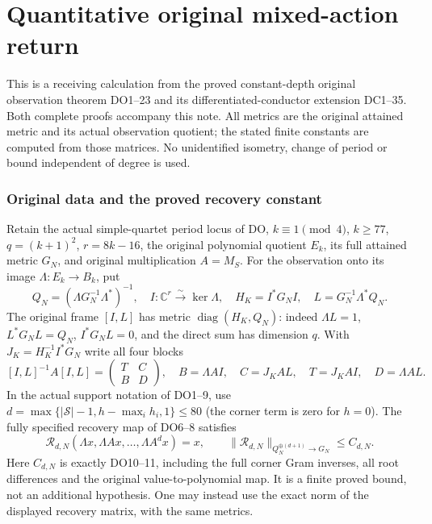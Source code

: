\endgroup

\clearpage\begingroup
\part*{Quantitative original mixed-action return}
\newcommand{\pmixedrank}{\operatorname{rank}}
\newcommand{\pmixeddiag}{\operatorname{diag}}


This is a receiving calculation from the proved constant-depth original
observation theorem DO1--23 and its differentiated-conductor extension
DC1--35. Both complete proofs accompany this note. All metrics are the
original attained metric and its actual observation quotient; the stated
finite constants are computed from those matrices. No unidentified
isometry, change of period or bound independent of degree is used.

\section{Original data and the proved recovery constant}
Retain the actual simple-quartet period locus of DO, $k\equiv1\pmod4$,
$k\ge77$, $q=(k+1)^2$, $r=8k-16$, the original polynomial quotient
$E_k$, its full attained metric $G_N$, and original multiplication $A=M_S$.
For the observation onto its image $\Lambda:E_k\to B_k$, put
\[
 Q_N=(\Lambda G_N^{-1}\Lambda^*)^{-1},\quad
 I:\mathbb C^r\overset\sim\longrightarrow\ker\Lambda,
 \quad H_K=I^*G_NI,\quad L=G_N^{-1}\Lambda^*Q_N.
 \tag{DQ1}
\]
The original frame $[I,L]$ has metric $\pmixeddiag(H_K,Q_N)$: indeed
$\Lambda L=1$, $L^*G_NL=Q_N$, $I^*G_NL=0$, and the direct sum
has dimension $q$. With $J_K=H_K^{-1}I^*G_N$ write all four blocks
\[
 [I,L]^{-1}A[I,L]=\begin{pmatrix}T&C\\B&D\end{pmatrix},\quad
 B=\Lambda AI,\quad C=J_KAL,\quad T=J_KAI,\quad D=\Lambda AL.
 \tag{DQ2}
\]
In the actual support notation of DO1--9, use
$d=\max\{|\mathcal S|-1,h-\max_i h_i,1\}\le80$ (the corner term
is zero for $h=0$). The fully specified recovery map of DO6--8 satisfies
\[
 \mathcal R_{d,N}(\Lambda x,\Lambda Ax,\ldots,\Lambda A^dx)=x,
 \qquad \|\mathcal R_{d,N}\|_{Q_N^{\oplus(d+1)}\to G_N}
       \le C_{d,N}.\tag{DQ3}
\]
Here $C_{d,N}$ is exactly DO10--11, including the full corner Gram
inverses, all root differences and the original value-to-polynomial map.
It is a finite proved bound, not an additional hypothesis. One may instead
use the exact norm of the displayed recovery matrix, with the same metrics.

